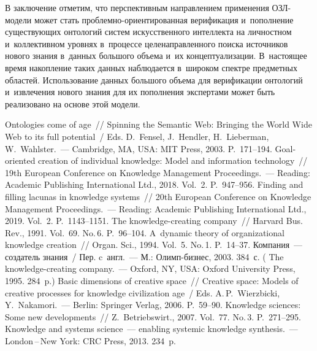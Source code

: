 {\begin{multicols}{2}
  В заключение отметим, что перспективным направлением применения  
ОЗЛ-мо\-де\-ли может стать проб\-лем\-но-ори\-ен\-ти\-ро\-ван\-ная 
верификация и~пополнение существующих онтологий систем искусственного 
интеллекта на личностном и~коллективном уровнях в~процессе 
целенаправленного поиска источников нового знания в~данных большого 
объема и~их концептуализации. В~настоящее время накопление таких данных 
наблюдается в~широком спектре предметных областей. Использование данных 
большого объема для верификации онтологий и~извлечения нового знания для  
их пополнения экспертами может быть реализовано на основе этой модели.
  
{\small\frenchspacing
 {%
 \begin{thebibliography}{99}
 Ontologies come of age~// Spinning the Semantic Web: Bringing the 
World Wide Web to its full potential~/ Eds. D.~Fensel, J.~Hendler, H.~Lieberman,  
W.~Wahlster.~--- Cambridge, MA, USA: MIT Press, 2003. P.~171--194.
 Goal-oriented creation of individual knowledge: Model and information 
technology~// 19th European Conference on Knowledge Management Proceedings.~--- Reading: 
Academic Publishing International Ltd., 2018. Vol.~2. P.~947--956.
 Finding and filling lacunas in knowledge systems~// 20th European Conference 
on Knowledge Management Proceedings.~--- Reading: Academic Publishing International Ltd., 
2019. Vol.~2. P.~1143--1151.
 The knowledge-creating company~// Harvard Bus. Rev., 1991. Vol.~69. 
No.\,6. P.~96--104.
 A~dynamic theory of organizational knowledge creation~// Organ.
Sci.,  1994. Vol.~5. No.\,1. P.~14--37.
 Компания~--- создатель знания~/
Пер. c~англ.~--- М.: Олимп-биз\-нес, 2003. 
384~с. ( The knowledge-creating company.~--- Oxford, NY, USA: 
Oxford University Press, 1995. 284~p.)
 Basic dimensions of creative space~// Creative space: Models 
of creative processes for knowledge civilization age~/ Eds. A.\,P.~Wierzbicki, Y.~Nakamori.~--- 
Berlin: Springer Verlag, 2006. P.~59--90.
 Knowledge sciences: Some new developments~// 
Z.~Betriebswirt., 2007. Vol.~77. No.\,3. P.~271--295.
 Knowledge and systems science~--- enabling systemic knowledge synthesis.~--- 
London\,--\,New York: CRC Press, 2013. 234~p.

\end{thebibliography}}}
\end{multicols}}
